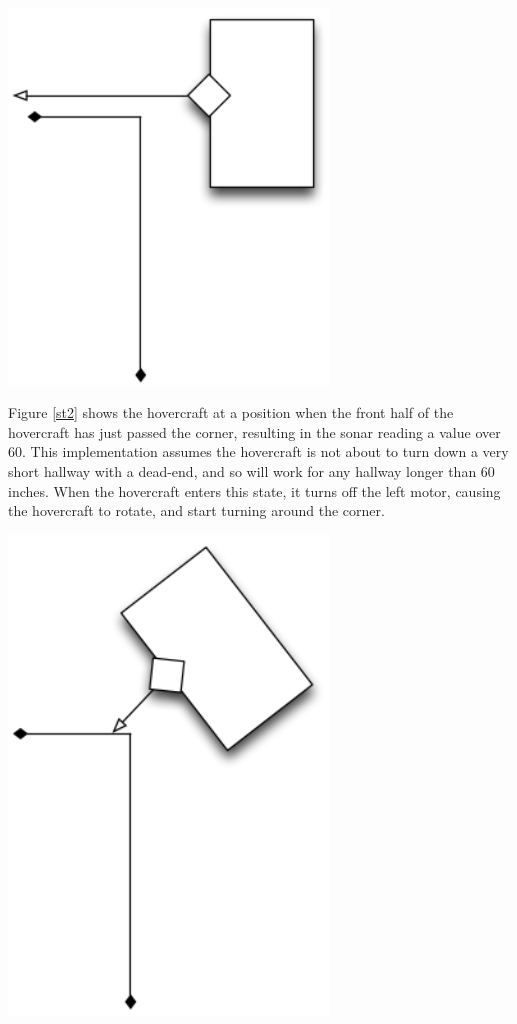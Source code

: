 \begin{center}
 \includegraphics[width=85mm]{imageSources/sonarturn2.png}
\end{center}
\label{st2}

Figure \ref{st2} shows the hovercraft at a position when the front half of the hovercraft has just passed  the corner, resulting in the sonar reading a value over 60. This implementation assumes the hovercraft is not about to turn down a very short hallway with a dead-end, and so will work for any hallway longer than 60 inches. When the hovercraft enters this state, it turns off the left motor, causing the hovercraft to rotate, and start turning around the corner.

\begin{center}
 \includegraphics[width=85mm]{imageSources/sonarturn3.png}
\end{center}
\label{st3}

